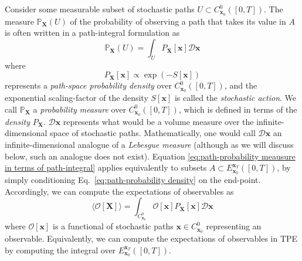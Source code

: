 Consider some measurable subset of stochastic paths $U \subset C_{\mathbf{x}_0}^0([0,T])$. The measure $\mathbb{P}_\mathbf{X}(U)$ of the probability of observing a path that takes its value in $A$ is often written in a path-integral formulation as \citep{huntPathIntegralSolutions1981, adibStochasticActionsDiffusive2008, chaichianPathIntegralsPhysics2001}
\begin{equation} \label{eq:path-probability meausure in terms of path-integral}
\mathbb{P}_\mathbf{X}(U) = \int_U P_\mathbf{X}[\mathbf{x}] \mathcal{D} \mathbf{x}
\end{equation}
where
\begin{equation} \label{eq:path-probability density}
P_\mathbf{X}[\mathbf{x}] \propto \exp(-S[\mathbf{x}])
\end{equation}
represents a \textit{path-space probability density} over $C_{\mathbf{x}_0}^0([0,T])$, and the exponential scaling-factor of the density $S[\mathbf{x}]$ is called the \textit{stochastic action}. We call $\mathbb{P}_\mathbf{X}$ a \textit{probability measure} over $C_{\mathbf{x}_0}^0([0,T])$, which is defined in terms of the \textit{density} $P_\mathbf{X}$. $\mathcal{D} \mathbf{x}$ represents what would be a volume measure over the infinite-dimensional space of stochastic paths. Mathematically, one would call $\mathcal{D} \mathbf{x}$ an infinite-dimensional analogue of a \textit{Lebesgue measure} (although as we will discuss below, such an analogue does not exist). Equation \ref{eq:path-probability meausure in terms of path-integral} applies equivalently to subsets $A \subset E_{\mathbf{x}_0}^{\mathbf{x}_T}([0,T])$, by simply conditioning Eq.~\ref{eq:path-probability density} on the end-point. Accordingly, we can compute the expectations of observables as
\begin{equation} \label{eq:expectation of observable}
	\langle \mathcal{O}[\mathbf{X}] \rangle = \int_{C_{\mathbf{x}_0}^0} \mathcal{O}[\mathbf{x}] P_\mathbf{X}[\mathbf{x}] \mathcal{D} \mathbf{x}
\end{equation}
where $\mathcal{O}[\mathbf{x}]$ is a functional of stochastic paths $\mathbf{x} \in C_{\mathbf{x}_0}^0$ representing an observable. Equivalently, we can compute the expectations of observables in TPE by computing the integral over $E_{\mathbf{x}_0}^{\mathbf{x}_T}([0,T])$.

